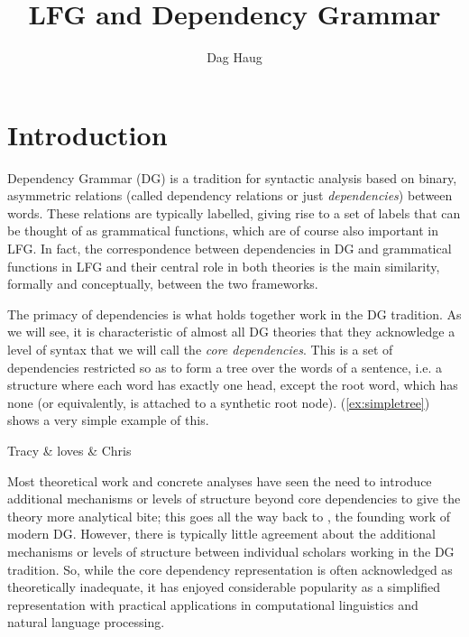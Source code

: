 \documentclass[output=paper,hidelinks]{langscibook}
\title{LFG and Dependency Grammar}
\author{Dag Haug\affiliation{University of Oslo}}
\begin{document}
\maketitle
\label{chap:Dependency}

\section{Introduction}\label{sec:Dependency:intro}
Dependency Grammar (DG) is a tradition for syntactic analysis based on
binary, asymmetric relations (called dependency relations or just
\emph{dependencies}) between words. These relations are typically
labelled, giving rise to a set of labels that can be thought of as
grammatical functions, which are of course also important in
LFG. In fact, the correspondence between dependencies in DG and
grammatical functions in LFG and their central role in both theories
is the main similarity, formally and conceptually, between the two
frameworks.

The primacy of dependencies is what holds together work in the DG
tradition. As we will see, it is characteristic of almost all
DG theories that they acknowledge a level of syntax that we will call
the \emph{core dependencies}. This is a set of dependencies restricted
so as to form a tree over the words of a sentence, i.e. a structure
where each word has exactly one head, except the root word, which has
none (or equivalently, is attached to a synthetic root node). (\ref{ex:simpletree})
shows a very simple example of this.

\begin{exe}
  \ex\label{ex:simpletree}
  \begin{dependency}[baseline=-0.6ex,theme=simple]
    \begin{deptext}
      Tracy \& loves \& Chris\\
    \end{deptext}
  \end{dependency}
\end{exe}
Most theoretical work and concrete analyses have seen the need to
introduce additional mechanisms or levels of structure beyond core
dependencies to give the theory more analytical bite; this goes all
the way back to \citet{Tesniere1959}, the founding work of modern DG.
However, there is typically little agreement about the additional
mechanisms or levels of structure between individual scholars working
in the DG tradition. So, while the core dependency representation is
often acknowledged as theoretically inadequate, it has enjoyed
considerable popularity as a simplified representation with practical
applications in computational linguistics and natural language
processing.
\end{document}
